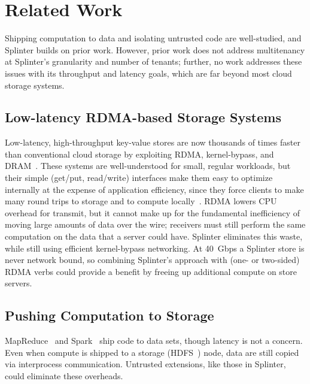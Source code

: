 \section{Related Work}
\label{sec:related}

Shipping computation to data and isolating untrusted code are well-studied, and
Splinter builds on prior work.
However, prior work does not address multitenancy at Splinter's granularity and
number of tenants; further, no work addresses
these issues with its throughput and latency goals, which are far
beyond most cloud storage systems.

\subsection{Low-latency RDMA-based Storage Systems}
%
Low-latency, high-throughput key-value stores are now thousands of times faster
  than conventional cloud storage by exploiting RDMA, kernel-bypass, and
  DRAM~\cite{farm-2014,farm-txns,herd,billions,mica,ramcloud}.
These systems are well-understood for small, regular workloads, but their
  simple (get/put, read/write) interfaces make them easy to optimize internally
  at the expense of application efficiency, since they
  force clients to make many round trips to storage and to compute locally~\cite{deb-farm}.
%
RDMA lowers CPU overhead for transmit, but it cannot make up for the
  fundamental inefficiency of moving large amounts of data over the wire;
  receivers must still perform the same computation
  on the data that a server could have.
Splinter eliminates this waste, while still using efficient kernel-bypass networking.
%
At 40~Gbps a Splinter store is never network bound, so combining Splinter's
  approach with (one- or two-sided) RDMA verbs could provide a benefit by freeing up
  additional compute on store servers.

\subsection{Pushing Computation to Storage}

MapReduce~\cite{mapreduce} and Spark~\cite{spark} ship code to data
sets, though latency is not a concern.  Even when compute is shipped to a storage
(HDFS~\cite{hdfs}) node, data are still copied via interprocess
communication.  Untrusted extensions, like those in Splinter, could
eliminate these overheads.


